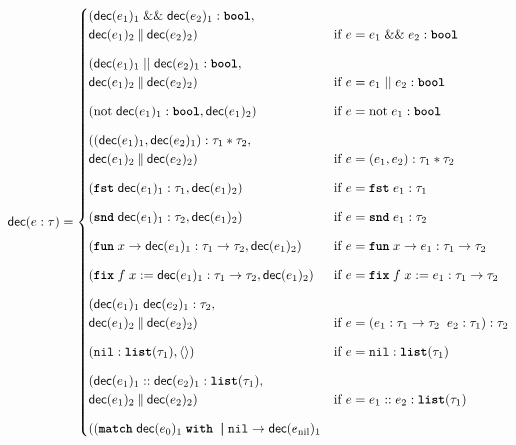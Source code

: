 \begin{figure}
    \small
	\centering
	\begin{align*}
		\mathsf{dec}(e : \tau) =
		\begin{cases}
            (\mathsf{dec}(e_1)_1 \mathrel{\&\&} \mathsf{dec}(e_2)_1 : \textnormal{\ttfamily\bfseries bool}, \\
			\mathsf{dec}(e_1)_2 \mathbin{\|} \mathsf{dec}(e_2)_2)
				& \text{if } e = e_1 \mathrel{\&\&} e_2 : \textnormal{\ttfamily\bfseries bool} \\[8pt]
			(\mathsf{dec}(e_1)_1 \mathrel{||} \mathsf{dec}(e_2)_1 : \textnormal{\ttfamily\bfseries bool}, \\
			\mathsf{dec}(e_1)_2 \mathbin{\|} \mathsf{dec}(e_2)_2)
				& \text{if } e = e_1 \mathrel{||} e_2 : \textnormal{\ttfamily\bfseries bool} \\[8pt]
			(\text{not}\; \mathsf{dec}(e_1)_1 : \textnormal{\ttfamily\bfseries bool}, \mathsf{dec}(e_1)_2)
				& \text{if } e = \text{not}\; e_1 : \textnormal{\ttfamily\bfseries bool} \\[8pt]
			((\mathsf{dec}(e_1)_1, \mathsf{dec}(e_2)_1) : \tau_1 * \tau_2, \\
			\mathsf{dec}(e_1)_2 \mathbin{\|} \mathsf{dec}(e_2)_2)
				& \text{if } e = (e_1, e_2) : \tau_1 * \tau_2 \\[8pt]
			(\textnormal{\ttfamily\bfseries fst}\; \mathsf{dec}(e_1)_1 : \tau_1, \mathsf{dec}(e_1)_2)
				& \text{if } e = \textnormal{\ttfamily\bfseries fst}\; e_1 : \tau_1 \\[8pt]
			(\textnormal{\ttfamily\bfseries snd}\; \mathsf{dec}(e_1)_1 : \tau_2, \mathsf{dec}(e_1)_2)
				& \text{if } e = \textnormal{\ttfamily\bfseries snd}\; e_1 : \tau_2 \\[8pt]
			(\textnormal{\ttfamily\bfseries fun}\; x \to \mathsf{dec}(e_1)_1 : \tau_1 \to \tau_2, \mathsf{dec}(e_1)_2)
				& \text{if } e = \textnormal{\ttfamily\bfseries fun}\; x \to e_1 : \tau_1 \to \tau_2 \\[8pt]
			(\textnormal{\ttfamily\bfseries fix}\; f\; x := \mathsf{dec}(e_1)_1 : \tau_1 \to \tau_2, \mathsf{dec}(e_1)_2)
				& \text{if } e = \textnormal{\ttfamily\bfseries fix}\; f\; x := e_1 : \tau_1 \to \tau_2 \\[8pt]
			(\mathsf{dec}(e_1)_1\; \mathsf{dec}(e_2)_1 : \tau_2, \\
			\mathsf{dec}(e_1)_2 \mathbin{\|} \mathsf{dec}(e_2)_2)
				& \text{if } e = (e_1 : \tau_1 \to \tau_2\;\; e_2 : \tau_1) : \tau_2 \\[8pt]
			(\textnormal{\ttfamily nil} : \textnormal{\ttfamily\bfseries list}(\tau_1), \langle\rangle)
				& \text{if } e = \textnormal{\ttfamily nil} : \textnormal{\ttfamily\bfseries list}(\tau_1) \\[8pt]
			(\mathsf{dec}(e_1)_1 :: \mathsf{dec}(e_2)_1 : \textnormal{\ttfamily\bfseries list}(\tau_1), \\
			\mathsf{dec}(e_1)_2 \mathbin{\|} \mathsf{dec}(e_2)_2)
				& \text{if } e = e_1 :: e_2 : \textnormal{\ttfamily\bfseries list}(\tau_1) \\[8pt]
			((\textnormal{\ttfamily\bfseries match}\; \mathsf{dec}(e_0)_1\; \textnormal{\ttfamily\bfseries with}\; \boldsymbol{\mid} \textnormal{\ttfamily nil} \rightarrow \mathsf{dec}(e_{\textnormal{nil}})_1 \\

\end{cases}
\end{align*}
\end{figure}
